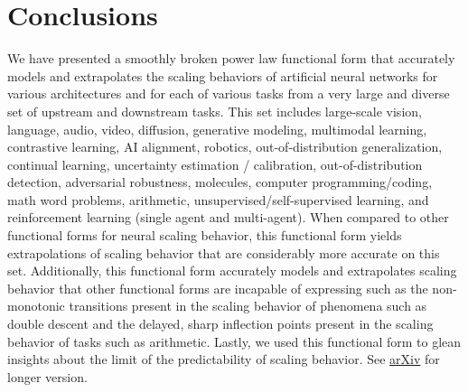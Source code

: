 \documentclass{article} %
\begin{document}
\section{Conclusions}
\vspace{-4.8mm}
We have presented a smoothly broken power law functional form that accurately models and extrapolates the scaling behaviors of artificial neural networks for various architectures and for each of various tasks from a very large and diverse set of upstream and downstream tasks. This set includes large-scale vision, language, audio, video, diffusion, generative modeling, multimodal learning, contrastive learning, AI alignment, robotics, out-of-distribution generalization, continual learning, uncertainty estimation / calibration, out-of-distribution detection, adversarial robustness, molecules, computer programming/coding, math word problems, arithmetic, unsupervised/self-supervised learning, and reinforcement learning (single agent and multi-agent). When compared to other functional forms for neural scaling behavior, this functional form yields extrapolations of scaling behavior that are considerably more accurate on this set. Additionally, this functional form accurately models and extrapolates scaling behavior that other functional forms are incapable of expressing such as the non-monotonic transitions present in the scaling behavior of phenomena such as double descent and the delayed, sharp inflection points present in the scaling behavior of tasks such as arithmetic. Lastly, we used this functional form to glean insights about the limit of the predictability of scaling behavior. See \href{https://arxiv.org/abs/2210.14891}{arXiv} for longer version.


\end{document}
